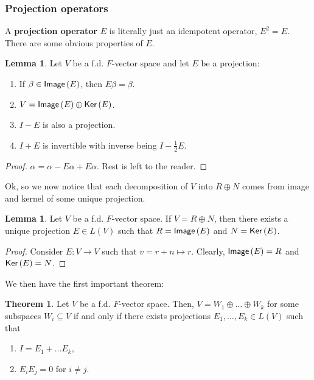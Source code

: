 \documentclass[letterpaper,11pt,twoside]{article}
\theoremstyle{definition}
\theoremstyle{definition}
\newtheorem{theorem}[proposition]{Theorem}
\theoremstyle{definition}
\theoremstyle{definition}
\newtheorem{lemma}[proposition]{\textbf{Lemma}}
\theoremstyle{definition}
\theoremstyle{definition}
\theoremstyle{remark}
\theoremstyle{definition}
\newcommand{\Ker}[1]{{\fontfamily{lmss}\selectfont 
		\text{Ker}\left (#1\right )
}}
\newcommand{\Image}[1]{{\fontfamily{lmss}\selectfont 
		\text{Image}\left (#1\right )
}}
\begin{document}
    \subsubsection{Projection operators}
    A \textbf{projection operator} $E$ is literally just an idempotent operator, $E^2 = E$. There are some obvious properties of $E$.
    \begin{lemma}
    Let $V$ be a f.d. $F$-vector space and let $E$ be a projection:
    \begin{enumerate}
        \item {If $\beta \in \Image{E}$, then $E\beta = \beta$.}
        \item{$V = \Image{E} \oplus \Ker{E}$.}
        \item{$I-E$ is also a projection.}
        \item{$I+E$ is invertible with inverse being $I-\frac{1}{2}E$.}
    \end{enumerate}
    \end{lemma}
    \begin{proof}
   $\alpha = \alpha -E\alpha + E\alpha$. Rest is left to the reader.
    \end{proof}
    Ok, so we now notice that each decomposition of $V$ into $R\oplus N$ comes from image and kernel of some unique projection.
    \begin{lemma}
    Let $V$ be a f.d. $F$-vector space. If $V = R\oplus N$, then there exists a unique projection $E\in L(V)$ such that $R = \Image{E}$ and $N=\Ker{E}$.
    \end{lemma}
    \begin{proof}
    Consider $E : V\to V$ such that $v = r+n \mapsto r$. Clearly, $\Image{E} = R$ and $\Ker{E} = N$.
    \end{proof}
    We then have the first important theorem:
    \begin{theorem}\label{T-2.6.5}
    Let $V$ be a f.d. $F$-vector space. Then, $V = W_1\oplus \dots \oplus W_k$ for some subspaces $W_i\subseteq V$ if and only if there exists projections $E_1,\dots, E_k \in L(V)$ such that 
    \begin{enumerate}
        \item {$I = E_1+ \dots E_k$,}
        \item{$E_iE_j = 0$ for $i\neq j$.}
    \end{enumerate}
    \end{theorem}
\end{document}
